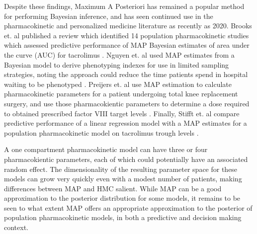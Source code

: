 Despite these findings, Maximum A Posteriori has remained a popular method for performing Bayesian inference, and has seen continued use in the pharmacokinetic and personalized medicine literature as recently as 2020. Brooks et. al \cite{Brooks2016-li} published a review which identified 14 population pharmacokinetic studies which assessed predictive performance of MAP Bayesian estimates of area under the curve (AUC) for tacrolimus  \cite{Brooks2016-li}.  Nguyen et. al used MAP estimates from a Bayesian model to derive phenotyping indexes for use in limited sampling strategies, noting the approach could reduce the time patients spend in hospital waiting to be phenotyped \cite{Nguyen2016-pg}. Preijers et. al use MAP estimation to calculate  pharmacokinetic parameters for a patient undergoing total knee replacement surgery, and use those pharmacokientic parameters to determine a dose required to obtained prescribed factor VIII target levels \cite{Preijers2019-k}.  Finally, Stifft et. al compare predictive performance of a linear regression model with a MAP estimates for a population pharmacokinetic model on tacrolimus trough levels \cite{Stifft2020-uq}.

A one compartment pharmacokinetic model can have three or four pharmacokientic parameters, each of which could potentially have an associated random effect.  The dimensionality of the resulting parameter space for these models can grow very quickly even with a modest number of patients, making differences between MAP and HMC salient.  While MAP can be a good approximation to the posterior distribution for some models, it remains to be seen to what extent MAP offers an appropriate approximation to the posterior of population pharmacokinetic models, in both a predictive and decision making context.

